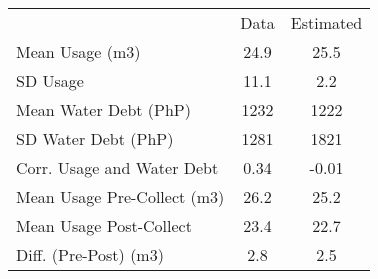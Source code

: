 \begin{tabular}{lcc}
& Data & Estimated \\
Mean Usage (m3) &24.9&25.5\\
SD Usage &11.1&2.2\\
Mean Water Debt (PhP) &1232&1222\\
SD Water Debt (PhP) &1281&1821\\
Corr. Usage and Water Debt &0.34&-0.01\\
Mean Usage Pre-Collect (m3) &26.2&25.2\\
Mean Usage Post-Collect &23.4&22.7\\
Diff. (Pre-Post) (m3) &2.8&2.5\\
\end{tabular} 
